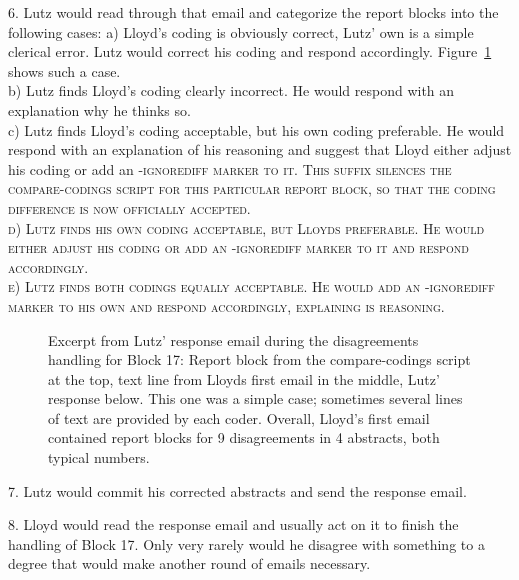 \documentclass[10pt,journal,compsoc]{IEEEtran}
\newcommand{\Cb}[1]{\bgroup\scshape #1\egroup}  %
\newcommand{\Prg}[1]{\bgroup\ttfamily #1\egroup}  %
\begin{document}
6. Lutz would read through that email and categorize the report blocks into the following cases:
a) Lloyd's coding is obviously correct, Lutz' own is a simple clerical error.
Lutz would correct his coding and respond accordingly.
Figure~\ref{email-MeyAlmKel22.png} shows such a case.\\
b) Lutz finds Lloyd's coding clearly incorrect. 
He would respond with an explanation why he thinks so.\\
c) Lutz finds Lloyd's coding acceptable, but his own coding preferable.
He would respond with an explanation of his reasoning and suggest that Lloyd
either adjust his coding or add an \Cb{-ignorediff} marker to it.
This suffix silences the \Prg{compare-codings} script for this particular report block,
so that the coding difference is now officially accepted.\\
d) Lutz finds his own coding acceptable, but Lloyds preferable.
He would either adjust his coding or add an \Cb{-ignorediff} marker to it
and respond accordingly.\\
e) Lutz finds both codings equally acceptable.
He would add an \Cb{-ignorediff} marker to his own
and respond accordingly, explaining is reasoning.\\

\begin{figure}[tbp]%
	\centering{}%
	\vspace{-2mm}\caption{Excerpt from Lutz' response email during the disagreements handling
	  for Block 17: 
	  Report block from the \Prg{compare-codings} script at the top,
	  text line from Lloyds first email in the middle,
	  Lutz' response below.
	  This one was a simple case; 
	  sometimes several lines of text are provided by each coder.
	  Overall, Lloyd's first email contained report blocks for 9 disagreements
	  in 4 abstracts, both typical numbers.}\label{email-MeyAlmKel22.png}%
\end{figure}

7. Lutz would commit his corrected abstracts and send the response email.

8. Lloyd would read the response email and usually act on it to finish the handling of 
Block 17.
Only very rarely would he disagree with something to a degree that would make
another round of emails necessary.
\end{document}
